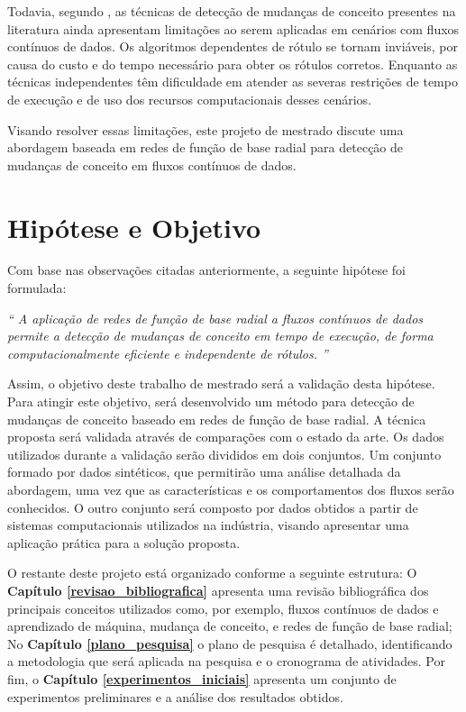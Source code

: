 \documentclass[qual, classic, a4paper]{ufbathesis}
\begin{document}
Todavia, segundo ,
as técnicas de detecção de mudanças de conceito presentes na literatura ainda apresentam limitações ao serem aplicadas em cenários com fluxos contínuos de dados.
% 
Os algoritmos dependentes de rótulo se tornam inviáveis, por causa do custo e do tempo necessário para obter os rótulos corretos.
%
Enquanto as técnicas independentes têm dificuldade em atender as severas restrições de tempo de execução e de uso dos recursos computacionais desses cenários.

Visando resolver essas limitações, 
este projeto de mestrado discute uma abordagem baseada em redes de função de base radial 
para detecção de mudanças de conceito em fluxos contínuos de dados.

\section{Hipótese e Objetivo}

Com base nas observações citadas anteriormente, a seguinte hipótese foi formulada:

\begin{center}
\textit{``
A aplicação de redes de função de base radial a fluxos contínuos de dados permite a detecção de mudanças de conceito em tempo de execução, de forma computacionalmente eficiente e independente de rótulos.
''}
\end{center}

Assim, o objetivo deste trabalho de mestrado será a validação desta hipótese.
%
Para atingir este objetivo, será desenvolvido um método para detecção de mudanças de conceito baseado em redes de função de base radial.
%
A técnica proposta será validada através de comparações com o estado da arte.
%
Os dados utilizados durante a validação serão divididos em dois conjuntos.
%
Um conjunto formado por dados sintéticos, que permitirão uma análise detalhada da abordagem, uma vez que as características e os comportamentos dos fluxos serão conhecidos.
%
O outro conjunto será composto por dados obtidos a partir de sistemas computacionais utilizados na indústria, visando apresentar uma aplicação prática para a solução proposta. 

O restante deste projeto está organizado conforme a seguinte estrutura: 
%
O \textbf{Capítulo \ref{revisao_bibliografica}} apresenta uma revisão bibliográfica dos principais conceitos utilizados como, por exemplo, fluxos contínuos de dados e aprendizado de máquina, mudança de conceito, e redes de função de base radial; 
%
No \textbf{Capítulo \ref{plano_pesquisa}} o plano de pesquisa é detalhado, identificando a metodologia que será aplicada na pesquisa e o cronograma de atividades. 
%
Por fim, o \textbf{Capítulo \ref{experimentos_iniciais}} apresenta um conjunto de experimentos preliminares e a análise dos resultados obtidos.
\end{document}

